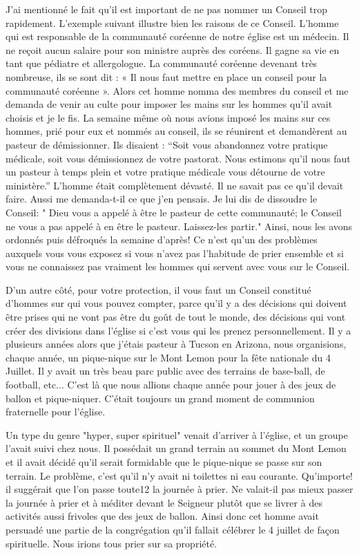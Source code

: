 J’ai mentionné le fait qu’il est important de ne pas nommer un Conseil trop rapidement. L’exemple suivant illustre bien
les raisons de ce Conseil. L’homme qui est responsable de la communauté coréenne de notre église est un médecin. Il
ne reçoit aucun salaire pour son ministre auprès des coréens. Il gagne sa vie en tant que pédiatre et allergologue. La
communauté coréenne devenant très nombreuse, ils se sont dit : « Il nous faut mettre en place un conseil pour la
communauté coréenne ». Alors cet homme nomma des membres du conseil et me demanda de venir au culte pour
imposer les mains sur les hommes qu’il avait choisis et je le fis. La semaine même où nous avions imposé les mains
sur ces hommes, prié pour eux et nommés au conseil, ils se réunirent et demandèrent au pasteur de démissionner. Ils
disaient : “Soit vous abandonnez votre pratique médicale, soit vous démissionnez de votre pastorat. Nous estimons
qu’il nous faut un pasteur à temps plein et votre pratique médicale vous détourne de votre ministère.” L’homme était
complètement dévasté. Il ne savait pas ce qu’il devait faire. Aussi me demanda-t-il ce que j’en pensais. Je lui dis de
dissoudre le Conseil: " Dieu vous a appelé à être le pasteur de cette communauté; le Conseil ne vous a pas appelé à
en être le pasteur. Laissez-les partir." Ainsi, nous les avons ordonnés puis défroqués la semaine d'après! Ce n’est
qu’un des problèmes auxquels vous vous exposez si vous n’avez pas l’habitude de prier ensemble et si vous ne
connaissez pas vraiment les hommes qui servent avec vous sur le Conseil.

D’un autre côté, pour votre protection, il vous faut un Conseil constitué d’hommes sur qui vous pouvez compter, parce
qu’il y a des décisions qui doivent être prises qui ne vont pas être du goût de tout le monde, des décisions qui vont
créer des divisions dans l’église si c'est vous qui les prenez personnellement. Il y a plusieurs années alors que j’étais
pasteur à Tucson en Arizona, nous organisions, chaque année, un pique-nique sur le Mont Lemon pour la fête
nationale du 4 Juillet. Il y avait un très beau parc public avec des terrains de base-ball, de football, etc... C’est là que
nous allions chaque année pour jouer à des jeux de ballon et pique-niquer. C'était toujours un grand moment de
communion fraternelle pour l'église.

Un type du genre "hyper, super spirituel" venait d'arriver à l'église, et un groupe l’avait suivi chez nous. Il possédait
un grand terrain au sommet du Mont Lemon et il avait décidé qu'il serait formidable que le pique-nique se passe sur
son terrain. Le problème, c'est qu'il n’y avait ni toilettes ni eau courante. Qu'importe! il suggérait que l’on passe toute12
la journée à prier. Ne valait-il pas mieux passer la journée à prier et à méditer devant le Seigneur plutôt
que se livrer à des activités aussi frivoles que des jeux de ballon. Ainsi donc cet homme avait persuadé une partie de
la congrégation qu'il fallait célébrer le 4 juillet de façon spirituelle. Nous irions tous prier sur sa propriété.

